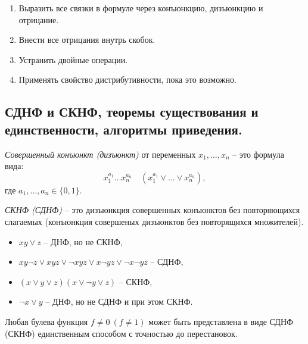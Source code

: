 \begin{note}\leavevmode
    \begin{enumerate}
        \item Выразить все связки в формуле через конъюнкцию, дизъюнкцию и отрицание.
        \item Внести все отрицания внутрь скобок.
        \item Устранить двойные операции.
        \item Применять свойство дистрибутивности, пока это возможно.
    \end{enumerate}
\end{note}

\subsection{СДНФ и СКНФ, теоремы существования и единственности, алгоритмы приведения.}

\begin{definition}
    \emph{Совершенный конъюнкт (дизъюнкт)} от переменных $x_1,\ldots,x_n$ -- это формула вида:
    \[
        x_1^{a_1}\ldots x_n^{a_n} \quad (x_1^{a_1}\lor \ldots \lor x_n^{a_n}),
    \]
    где $a_1,\ldots,a_n \in \{0,1\}$.
\end{definition}

\begin{definition}
    \emph{СКНФ (СДНФ)} -- это дизъюнкция совершенных конъюнктов без повторяющихся слагаемых (конъюнкция совершеных дизъюнктов без повторящихся множителей).
\end{definition}

\begin{example}\leavevmode
    \begin{itemize}
        \item $xy \lor z$ -- ДНФ, но не СКНФ,
        \item $xy\lnot z \lor xyz \lor \lnot xyz \lor x\lnot yz \lor \lnot x\lnot yz$ -- СДНФ,
        \item $(x\lor y\lor z)(x \lor \lnot y \lor z)$ -- СКНФ,
        \item $\lnot x \lor y$ -- ДНФ, но не СДНФ и при этом СКНФ.
    \end{itemize}
\end{example}

\begin{theorem}
    Любая булева функция $f\ne 0 \ (f\ne1)$ может быть представлена в виде СДНФ (СКНФ) единственным способом с точностью до перестановок.
\end{theorem}

